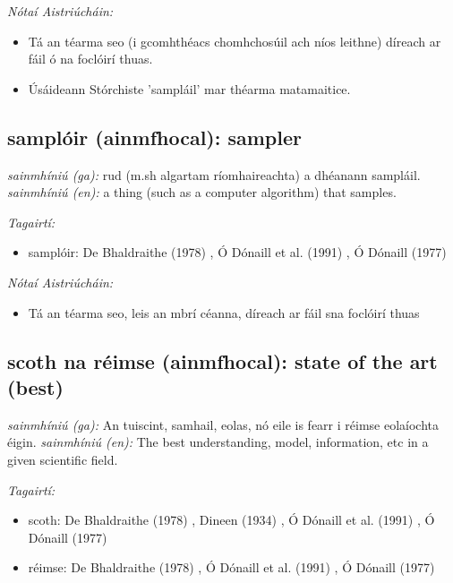 \documentclass{article}
\begin{document}
 \noindent \textit{Nótaí Aistriúcháin:}
\begin{itemize}
	\item Tá an téarma seo (i gcomhthéacs chomhchosúil ach níos leithne) díreach ar fáil ó na foclóirí thuas.
	\item Úsáideann Stórchiste 'sampláil' mar théarma matamaitice.
\end{itemize}


\subsection*{samplóir (ainmfhocal): sampler} 
 \noindent \textit{sainmhíniú (ga):} rud (m.sh algartam ríomhaireachta) a dhéanann sampláil.
\newline\newline
 \noindent \textit{sainmhíniú (en):} a thing (such as a computer algorithm) that samples.
\newline

 \noindent \textit{Tagairtí:}
\begin{itemize}
	\item samplóir: De Bhaldraithe (1978) \cite{de-bhaldraithe}, Ó Dónaill et al. (1991) \cite{focloir-beag}, Ó Dónaill (1977) \cite{odonaill}
\end{itemize}

 \noindent \textit{Nótaí Aistriúcháin:}
\begin{itemize}
	\item Tá an téarma seo, leis an mbrí céanna, díreach ar fáil sna foclóirí thuas
\end{itemize}


\subsection*{scoth na réimse (ainmfhocal): state of the art (best)} 
 \noindent \textit{sainmhíniú (ga):} An tuiscint, samhail, eolas, nó eile is fearr i réimse eolaíochta éigin.
\newline\newline
 \noindent \textit{sainmhíniú (en):} The best understanding, model, information, etc in a given scientific field.
\newline

 \noindent \textit{Tagairtí:}
\begin{itemize}
	\item scoth: De Bhaldraithe (1978) \cite{de-bhaldraithe}, Dineen (1934) \cite{dineen}, Ó Dónaill et al. (1991) \cite{focloir-beag}, Ó Dónaill (1977) \cite{odonaill}
	\item réimse: De Bhaldraithe (1978) \cite{de-bhaldraithe}, Ó Dónaill et al. (1991) \cite{focloir-beag}, Ó Dónaill (1977) \cite{odonaill}
\end{itemize}
\end{document}
